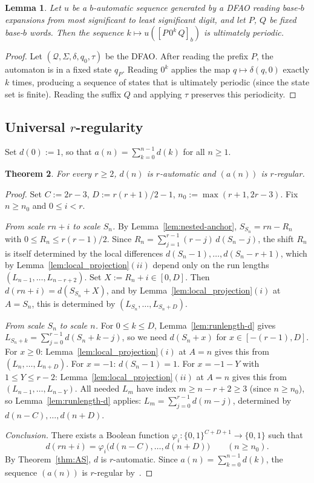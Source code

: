 \documentclass[12pt]{article}
\newtheorem{theorem}{Theorem}[section]
\newtheorem{lemma}[theorem]{Lemma}
\theoremstyle{definition}
\theoremstyle{remark}
\begin{document}
\begin{lemma}\label{lem:auto-geometric}
Let $u$ be a $b$-automatic sequence generated by a DFAO reading
base-$b$ expansions from most significant to least significant digit,
and let $P$, $Q$ be fixed base-$b$ words.
Then the sequence $k\mapsto u([P\,0^k\,Q]_b)$ is ultimately periodic.
\end{lemma}

\begin{proof}
Let $(\mathcal Q,\Sigma,\delta,q_0,\tau)$ be the DFAO.
After reading the prefix $P$, the automaton is in a fixed state $q_P$.
Reading $0^k$ applies the map $q\mapsto\delta(q,0)$ exactly $k$ times,
producing a sequence of states that is ultimately periodic
(since the state set is finite).
Reading the suffix $Q$ and applying $\tau$ preserves this periodicity.
\end{proof}

\subsection{Universal $r$-regularity}

Set $d(0):=1$, so that $a(n)=\sum_{k=0}^{n-1}d(k)$ for all $n\ge 1$.

\begin{theorem}\label{thm:structural_regularity}
For every $r\ge 2$, $d(n)$ is $r$-automatic and $(a(n))$ is $r$-regular.
\end{theorem}

\begin{proof}
Set $C:=2r-3$, $D:=r(r+1)/2-1$, $n_0:=\max(r+1,2r-3)$.
Fix $n\ge n_0$ and $0\le i<r$.

\textit{From scale $rn+i$ to scale $S_n$.}
By Lemma~\ref{lem:nested-anchor}, $S_{S_n}=rn-R_n$ with $0\le R_n\le r(r-1)/2$.
Since $R_n=\sum_{j=1}^{r-1}(r-j)\,d(S_n-j)$, the shift $R_n$ is itself
determined by the local differences $d(S_n-1),\ldots,d(S_n-r+1)$, which
by Lemma~\ref{lem:local_projection}$(ii)$ depend only on the run lengths
$(L_{n-1},\ldots,L_{n-r+2})$.
Set $X:=R_n+i\in[0,D]$.
Then $d(rn+i)=d(S_{S_n}+X)$, and by Lemma~\ref{lem:local_projection}$(i)$ at $A=S_n$,
this is determined by $(L_{S_n},\ldots,L_{S_n+D})$.

\textit{From scale $S_n$ to scale $n$.}
For $0\le k\le D$, Lemma~\ref{lem:runlength-d} gives
$L_{S_n+k}=\sum_{j=0}^{r-1}d(S_n+k-j)$,
so we need $d(S_n+x)$ for $x\in[-(r-1),D]$.
For $x\ge 0$: Lemma~\ref{lem:local_projection}$(i)$ at $A=n$ gives this from
$(L_n,\ldots,L_{n+D})$.
For $x=-1$: $d(S_n-1)=1$.
For $x=-1-Y$ with $1\le Y\le r-2$: Lemma~\ref{lem:local_projection}$(ii)$ at $A=n$
gives this from $(L_{n-1},\ldots,L_{n-Y})$.
All needed $L_m$ have index $m\ge n-r+2\ge 3$ (since $n\ge n_0$), so
Lemma~\ref{lem:runlength-d} applies: $L_m=\sum_{j=0}^{r-1}d(m-j)$,
determined by $d(n-C),\ldots,d(n+D)$.

\textit{Conclusion.}
There exists a Boolean function $\varphi_i:\{0,1\}^{C+D+1}\to\{0,1\}$ such that
\[
  d(rn+i)=\varphi_i\bigl(d(n-C),\ldots,d(n+D)\bigr)\qquad(n\ge n_0).
\]
By Theorem~\ref{thm:AS}, $d$ is $r$-automatic.
Since $a(n)=\sum_{k=0}^{n-1}d(k)$, the sequence $(a(n))$ is $r$-regular
by~\cite[Theorem~2.5]{AS92}.
\end{proof}
\end{document}
